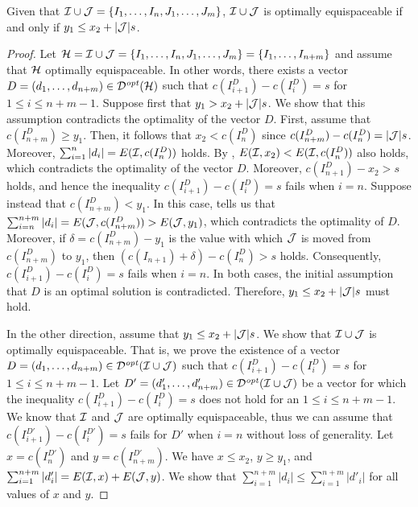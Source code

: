\begin{mlemmarep}\label{lem:tmd_opt_of_opts}
    Given that $\mathcal{I} \cup \mathcal{J} = \{I_1,\ldots,I_n,J_1,\ldots,J_m\}$, $\mathcal{I} \cup \mathcal{J}$ is optimally equispaceable if and only if $y_1 \le x_2 + |\mathcal{J}|s$.
\end{mlemmarep}
\begin{proof}
    Let $\mathcal{H} = \mathcal{I} \cup \mathcal{J} = \{I_1,\ldots,I_n,J_1,\ldots,J_m\}= \{I_1,\ldots,I_{n+m}\}$ and assume that $\mathcal{H}$ optimally equispaceable.
    In other words, there exists a vector $D = (d_1,\ldots,d_{n+m}) \in \mathcal{D}^{\mathit{opt}}(\mathcal{H})$ such that $c(I^D_{i+1}) - c(I^D_{i}) = s$ for $1\le i\le n+m-1$.
    Suppose first that $y_1 > x_2 + |\mathcal{J}| s$.
    We show that this assumption contradicts the optimality of the vector $D$.
    First, assume that $c(I^D_{n+m}) \ge y_1$.
    Then, it follows that $x_2 < c(I^D_n)$ since $c(I^D_{n+m}) - c(I^D_n) = |\mathcal{J}|s$.
    Moreover, $\sum_{i=1}^n |d_i| = E(\mathcal{I},c(I^D_{n}))$ holds.
    By , $E(\mathcal{I},x_2) < E(\mathcal{I},c(I^D_{n}))$ also holds, which contradicts the optimality of the vector $D$.
    Moreover, $c(I^D_{n+1})-x_2 >s$ holds, and hence the inequality $c(I^D_{i+1}) - c(I^D_{i}) = s$ fails when $i=n$.
    Suppose instead that $c(I^D_{n+m}) < y_1$.
    In this case,  tells us that $\sum_{i=n}^{n+m} |d_i| = E(\mathcal{J},c(I^D_{n+m})) > E(\mathcal{J},y_1)$, which contradicts the optimality of $D$.
    Moreover, if $\delta = c(I^D_{n+m})-y_1$ is the value with which $\mathcal{J}$ is moved from $c(I^D_{n+m})$ to $y_1$, then $(c(I_{n+1}) + \delta) - c(I^D_n) > s$ holds.
    Consequently, $c(I^D_{i+1}) - c(I^D_{i}) = s$ fails when $i = n$.
    In both cases, the initial assumption that $D$ is an optimal solution is contradicted.
    Therefore, $y_1 \le x_2 + |\mathcal{J}|s$ must hold.

    In the other direction, assume that $y_1 \le x_2 + |\mathcal{J}|s$.
    We show that $\mathcal{I}\cup \mathcal{J}$ is optimally equispaceable.
    That is, we prove the existence of a vector $D = (d_1,\ldots,d_{n+m}) \in \mathcal{D}^{\mathit{opt}}(\mathcal{I}\cup \mathcal{J})$ such that $c(I^D_{i+1}) - c(I^D_{i}) = s$ for $1\le i\le n+m-1$.
    Let $D' = (d'_1,\ldots,d'_{n+m}) \in \mathcal{D}^{\mathit{opt}}(\mathcal{I}\cup \mathcal{J})$ be a vector for which the inequality $c(I^D_{i+1}) - c(I^D_{i}) = s$ does not hold for an $1\le i \le n+m-1$.
    We know that $\mathcal{I}$ and $\mathcal{J}$ are optimally equispaceable, thus we can assume that $c(I^{D'}_{i+1}) - c(I^{D'}_{i}) = s$ fails for $D'$ when $i=n$ without loss of generality.
    Let $x = c(I^{D'}_n)$ and $y=c(I^{D'}_{n+m})$.
    We have $x\le x_2$, $y\ge y_1$, and $\sum_{i=1}^{n+m} |d'_i| = E(\mathcal{I},x) + E(\mathcal{J},y)$.
    We show that $\sum_{i=1}^{n+m} |d_i| \le \sum_{i=1}^{n+m} |d'_i|$ for all values of $x$ and $y$.
    

\end{proof}
